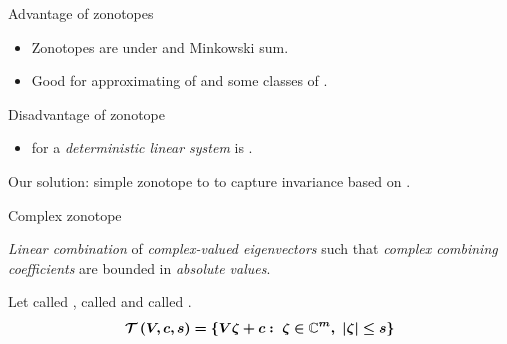 \begin{frame}{Advantage of zonotopes}
\begin{itemize}
\item Zonotopes are  under  and {Minkowski sum}.
\item Good for approximating 
of  and some classes
of .
\end{itemize}
\pause
{}
\end{frame}

\begin{frame}{Disadvantage of zonotope}
%
\begin{itemize}
\item {} for a {\it deterministic linear
system} is .
\end{itemize}
\pause
%
Our solution:
%
 simple zonotope to  to
capture invariance based on .
\end{frame}

\begin{frame}{Complex zonotope}
%

\emph{Linear combination} of
\emph{ complex-valued eigenvectors} such that \emph{
complex combining coefficients} are  bounded in \emph{absolute
values}.

%
\begin{block}{}
Let  called ,
 called  and 
called .
%
{\color{black}
\[
\bm{
\mathit{\operatorname{\mathcal{T}}}\left(V,c,s\right)=\left\{V\zeta+c:~\zeta\in\mathbb{C}^m,~\left|\zeta\right|\leq
s\right\}
}
\]
}
\end{block}
%
\end{frame}

